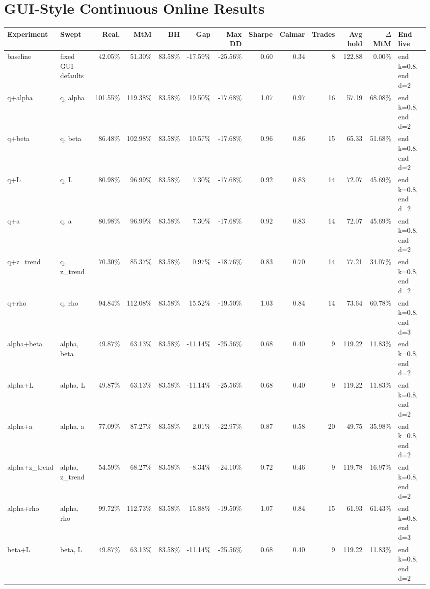 \documentclass[10pt]{article}
\begin{document}
\section*{GUI-Style Continuous Online Results}
\scriptsize
\setlength{\tabcolsep}{3pt}
\begin{longtable}{p{0.9in}p{1.15in}rrrrrrrrrrp{1.1in}}
\toprule
Experiment & Swept & Real. & MtM & BH & Gap & Max DD & Sharpe & Calmar & Trades & Avg hold & $\Delta$ MtM & End live \\
\midrule
baseline & fixed GUI defaults & 42.05\% & 51.30\% & 83.58\% & -17.59\% & -25.56\% & 0.60 & 0.34 & 8 & 122.88 & 0.00\% & end k=0.8, end d=2 \\
q+alpha & q, alpha & 101.55\% & 119.38\% & 83.58\% & 19.50\% & -17.68\% & 1.07 & 0.97 & 16 & 57.19 & 68.08\% & end k=0.8, end d=2 \\
q+beta & q, beta & 86.48\% & 102.98\% & 83.58\% & 10.57\% & -17.68\% & 0.96 & 0.86 & 15 & 65.33 & 51.68\% & end k=0.8, end d=2 \\
q+L & q, L & 80.98\% & 96.99\% & 83.58\% & 7.30\% & -17.68\% & 0.92 & 0.83 & 14 & 72.07 & 45.69\% & end k=0.8, end d=2 \\
q+a & q, a & 80.98\% & 96.99\% & 83.58\% & 7.30\% & -17.68\% & 0.92 & 0.83 & 14 & 72.07 & 45.69\% & end k=0.8, end d=2 \\
q+z\_trend & q, z\_trend & 70.30\% & 85.37\% & 83.58\% & 0.97\% & -18.76\% & 0.83 & 0.70 & 14 & 77.21 & 34.07\% & end k=0.8, end d=2 \\
q+rho & q, rho & 94.84\% & 112.08\% & 83.58\% & 15.52\% & -19.50\% & 1.03 & 0.84 & 14 & 73.64 & 60.78\% & end k=0.8, end d=3 \\
alpha+beta & alpha, beta & 49.87\% & 63.13\% & 83.58\% & -11.14\% & -25.56\% & 0.68 & 0.40 & 9 & 119.22 & 11.83\% & end k=0.8, end d=2 \\
alpha+L & alpha, L & 49.87\% & 63.13\% & 83.58\% & -11.14\% & -25.56\% & 0.68 & 0.40 & 9 & 119.22 & 11.83\% & end k=0.8, end d=2 \\
alpha+a & alpha, a & 77.09\% & 87.27\% & 83.58\% & 2.01\% & -22.97\% & 0.87 & 0.58 & 20 & 49.75 & 35.98\% & end k=0.8, end d=2 \\
alpha+z\_trend & alpha, z\_trend & 54.59\% & 68.27\% & 83.58\% & -8.34\% & -24.10\% & 0.72 & 0.46 & 9 & 119.78 & 16.97\% & end k=0.8, end d=2 \\
alpha+rho & alpha, rho & 99.72\% & 112.73\% & 83.58\% & 15.88\% & -19.50\% & 1.07 & 0.84 & 15 & 61.93 & 61.43\% & end k=0.8, end d=3 \\
beta+L & beta, L & 49.87\% & 63.13\% & 83.58\% & -11.14\% & -25.56\% & 0.68 & 0.40 & 9 & 119.22 & 11.83\% & end k=0.8, end d=2 \\

\end{longtable}
\end{document}
